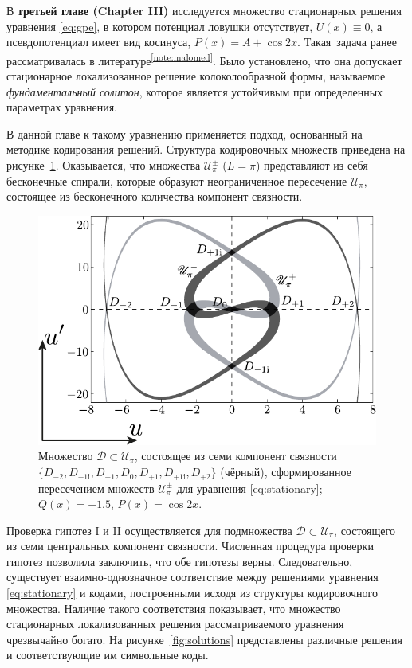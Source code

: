 \documentclass[candidate, href, colorlinks]{disser}
\begin{document}
В \textbf{третьей главе (Chapter III)} исследуется множество стационарных решения уравнения \eqref{eq:gpe}, в котором потенциал ловушки отсутствует, $U(x) \equiv 0$, а псевдопотенциал имеет вид косинуса, $P(x) = A + \cos 2x$.
Такая задача ранее рассматривалась в литературе\textsuperscript{\ref{note:malomed}}.
Было установлено, что она допускает стационарное локализованное решение колоколообразной формы, называемое {\it фундаментальный солитон}, которое является устойчивым при определенных параметрах уравнения.

В данной главе к такому уравнению применяется подход, основанный на методике кодирования решений.
Структура кодировочных множеств приведена на рисунке~\ref{fig:island-set}.
Оказывается, что множества $\mathscr{U}_{\pi}^{\pm}$ ($L = \pi$) представляют из себя бесконечные спирали, которые образуют неограниченное пересечение $\mathscr{U}_{\pi}$, состоящее из бесконечного количества компонент связности.

\begin{figure}[h]
\centering
	\includegraphics[scale = 1]{../pic/island set to check hypotheses for cosine equation}
	\caption{
		Множество $\mathcal{D} \subset \mathscr{U}_{\pi}$, состоящее из семи компонент связности $\{ D_{-2}, D_{-1\mathrm{i}}, D_{-1}, D_0, D_{+1}, D_{+1\mathrm{i}}, D_{+2} \}$ (чёрный), сформированное пересечением множеств $\mathscr{U}_{\pi}^{\pm}$ для уравнения \eqref{eq:stationary}; $Q(x) = -1.5$, $P(x) = \cos 2x$.
	}
\label{fig:island-set}
\end{figure}

Проверка гипотез I и II осуществляется для подмножества $\mathcal{D} \subset \mathscr{U}_{\pi}$, состоящего из семи центральных компонент связности.
Численная процедура проверки гипотез позволила заключить, что обе гипотезы верны.
Следовательно, существует взаимно-однозначное соответствие между решениями уравнения \eqref{eq:stationary} и кодами, построенными исходя из структуры кодировочного множества.
Наличие такого соответствия показывает, что множество стационарных локализованных решения рассматриваемого уравнения чрезвычайно богато.
На рисунке~\ref{fig:solutions} представлены различные решения и соответствующие им символьные коды.
\end{document}
